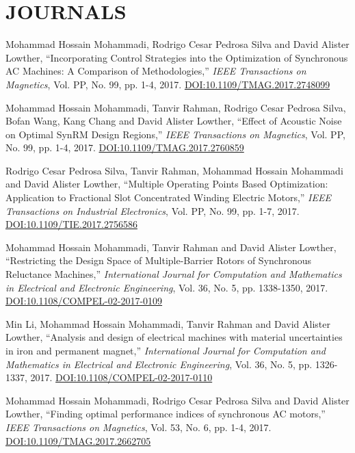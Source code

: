 \section{JOURNALS}

Mohammad Hossain Mohammadi, Rodrigo Cesar Pedrosa Silva and David Alister Lowther, ``Incorporating Control Strategies into the Optimization of Synchronous AC Machines: A Comparison of Methodologies,'' \textit{IEEE Transactions on Magnetics}, Vol. PP, No. 99, pp. 1-4, 2017. \n\href{https://doi.org/10.1109/TMAG.2017.2748099}{DOI:10.1109/TMAG.2017.2748099}

Mohammad Hossain Mohammadi, Tanvir Rahman, Rodrigo Cesar Pedrosa Silva, Bofan Wang, Kang Chang and David Alister Lowther, ``Effect of Acoustic Noise on Optimal SynRM Design Regions,'' \textit{IEEE Transactions on Magnetics}, Vol. PP, No. 99, pp. 1-4, 2017. \n\href{https://doi.org/10.1109/TMAG.2017.2760859}{DOI:10.1109/TMAG.2017.2760859}

Rodrigo Cesar Pedrosa Silva, Tanvir Rahman, Mohammad Hossain Mohammadi and David Alister Lowther, ``Multiple Operating Points Based Optimization: Application to Fractional Slot Concentrated Winding Electric Motors,'' \textit{IEEE Transactions on Industrial Electronics}, Vol. PP, No. 99, pp. 1-7, 2017. \n\href{https://doi.org/10.1109/TIE.2017.2756586}{DOI:10.1109/TIE.2017.2756586}

Mohammad Hossain Mohammadi, Tanvir Rahman and David Alister Lowther, ``Restricting the Design Space of Multiple-Barrier Rotors of Synchronous Reluctance Machines,'' \textit{International Journal for Computation and Mathematics in Electrical and Electronic Engineering}, Vol. 36, No. 5, pp. 1338-1350, 2017. \n\href{https://doi.org/10.1108/COMPEL-02-2017-0109}{DOI:10.1108/COMPEL-02-2017-0109}

Min Li, Mohammad Hossain Mohammadi, Tanvir Rahman and David Alister Lowther, ``Analysis and design of electrical machines with material uncertainties in iron and permanent magnet,'' \textit{International Journal for Computation and Mathematics in Electrical and Electronic Engineering}, Vol. 36, No. 5, pp. 1326-1337, 2017. \n\href{https://doi.org/10.1108/COMPEL-02-2017-0110}{DOI:10.1108/COMPEL-02-2017-0110}

Mohammad Hossain Mohammadi, Rodrigo Cesar Pedrosa Silva and David Alister Lowther, ``Finding optimal performance indices of synchronous AC motors,'' \textit{IEEE Transactions on Magnetics}, Vol. 53, No. 6, pp. 1-4, 2017. \n\href{https://doi.org/10.1109/TMAG.2017.2662705}{DOI:10.1109/TMAG.2017.2662705}

